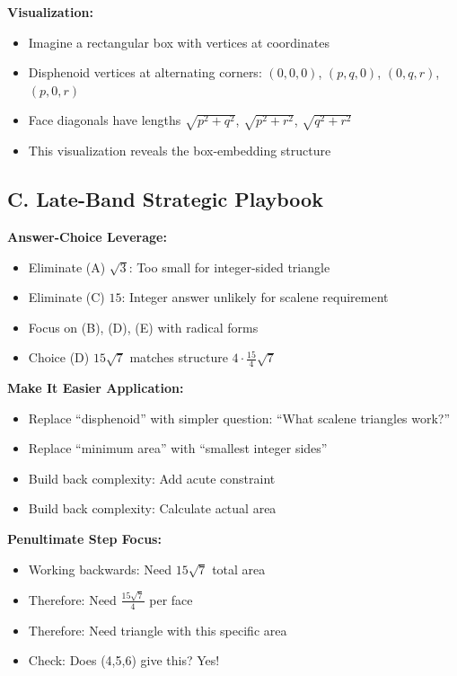 \documentclass[12pt]{article}
\begin{document}
\begin{strategicbox}
\textbf{Visualization:}
\begin{itemize}
    \item Imagine a rectangular box with vertices at coordinates
    \item Disphenoid vertices at alternating corners: $(0,0,0)$, $(p,q,0)$, $(0,q,r)$, $(p,0,r)$
    \item Face diagonals have lengths $\sqrt{p^2+q^2}$, $\sqrt{p^2+r^2}$, $\sqrt{q^2+r^2}$
    \item This visualization reveals the box-embedding structure
\end{itemize}

\subsection*{C. Late-Band Strategic Playbook}

\textbf{Answer-Choice Leverage:}
\begin{itemize}
    \item Eliminate (A) $\sqrt{3}$: Too small for integer-sided triangle
    \item Eliminate (C) $15$: Integer answer unlikely for scalene requirement
    \item Focus on (B), (D), (E) with radical forms
    \item Choice (D) $15\sqrt{7}$ matches structure $4 \cdot \frac{15}{4}\sqrt{7}$
\end{itemize}

\textbf{Make It Easier Application:}
\begin{itemize}
    \item Replace ``disphenoid'' with simpler question: ``What scalene triangles work?''
    \item Replace ``minimum area'' with ``smallest integer sides''
    \item Build back complexity: Add acute constraint
    \item Build back complexity: Calculate actual area
\end{itemize}

\textbf{Penultimate Step Focus:}
\begin{itemize}
    \item Working backwards: Need $15\sqrt{7}$ total area
    \item Therefore: Need $\frac{15\sqrt{7}}{4}$ per face
    \item Therefore: Need triangle with this specific area
    \item Check: Does (4,5,6) give this? Yes!
\end{itemize}


\end{strategicbox}
\end{document}
